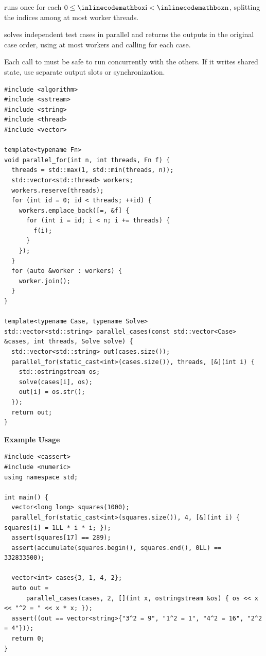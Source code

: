\begin{compactitem}
  \item {} runs  once for each $0 \leq {\inlinecodemath{i}} < {\inlinecodemath{n}}$, splitting the indices among at most  worker threads.
  \item {} solves independent test cases in parallel and returns the outputs in the original case order, using at most  workers and calling  for each case.
\end{compactitem}

Each call to  must be safe to run concurrently with the others. If it writes shared state, use separate output slots or synchronization.

\begin{lstlisting}[style=cpp]
#include <algorithm>
#include <sstream>
#include <string>
#include <thread>
#include <vector>

template<typename Fn>
void parallel_for(int n, int threads, Fn f) {
  threads = std::max(1, std::min(threads, n));
  std::vector<std::thread> workers;
  workers.reserve(threads);
  for (int id = 0; id < threads; ++id) {
    workers.emplace_back([=, &f] {
      for (int i = id; i < n; i += threads) {
        f(i);
      }
    });
  }
  for (auto &worker : workers) {
    worker.join();
  }
}

template<typename Case, typename Solve>
std::vector<std::string> parallel_cases(const std::vector<Case> &cases, int threads, Solve solve) {
  std::vector<std::string> out(cases.size());
  parallel_for(static_cast<int>(cases.size()), threads, [&](int i) {
    std::ostringstream os;
    solve(cases[i], os);
    out[i] = os.str();
  });
  return out;
}
\end{lstlisting}
\textbf{Example Usage}\par
\begin{lstlisting}[style=cpp]
#include <cassert>
#include <numeric>
using namespace std;

int main() {
  vector<long long> squares(1000);
  parallel_for(static_cast<int>(squares.size()), 4, [&](int i) { squares[i] = 1LL * i * i; });
  assert(squares[17] == 289);
  assert(accumulate(squares.begin(), squares.end(), 0LL) == 332833500);

  vector<int> cases{3, 1, 4, 2};
  auto out =
      parallel_cases(cases, 2, [](int x, ostringstream &os) { os << x << "^2 = " << x * x; });
  assert((out == vector<string>{"3^2 = 9", "1^2 = 1", "4^2 = 16", "2^2 = 4"}));
  return 0;
}
\end{lstlisting}

